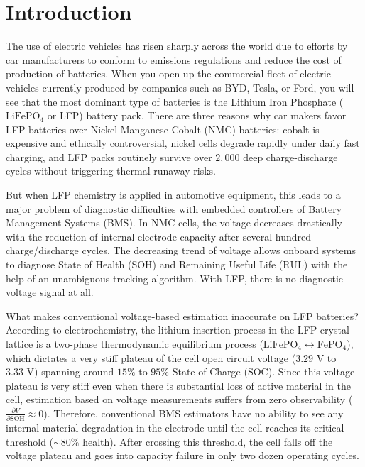 \documentclass[pdflatex,sn-mathphys-num]{sn-jnl}%
\theoremstyle{thmstyleone}%
\theoremstyle{thmstyletwo}%
\theoremstyle{thmstylethree}%
\begin{document}
\section{Introduction}\label{sec1}

The use of electric vehicles has risen sharply across the world due to efforts by car manufacturers to conform to emissions regulations and reduce the cost of production of batteries. When you open up the commercial fleet of electric vehicles currently produced by companies such as BYD, Tesla, or Ford, you will see that the most dominant type of batteries is the Lithium Iron Phosphate ($\text{LiFePO}_4$ or LFP) battery pack. There are three reasons why car makers favor LFP batteries over Nickel-Manganese-Cobalt (NMC) batteries: cobalt is expensive and ethically controversial, nickel cells degrade rapidly under daily fast charging, and LFP packs routinely survive over $2,000$ deep charge-discharge cycles without triggering thermal runaway risks.

But when LFP chemistry is applied in automotive equipment, this leads to a major problem of diagnostic difficulties with embedded controllers of Battery Management Systems (BMS). In NMC cells, the voltage decreases drastically with the reduction of internal electrode capacity after several hundred charge/discharge cycles. The decreasing trend of voltage allows onboard systems to diagnose State of Health ($\text{SOH}$) and Remaining Useful Life ($\text{RUL}$) with the help of an unambiguous tracking algorithm. With LFP, there is no diagnostic voltage signal at all.

What makes conventional voltage-based estimation inaccurate on LFP batteries? According to electrochemistry, the lithium insertion process in the LFP crystal lattice is a two-phase thermodynamic equilibrium process ($\text{LiFePO}_4 \leftrightarrow \text{FePO}_4$), which dictates a very stiff plateau of the cell open circuit voltage ($3.29\text{ V}$ to $3.33\text{ V}$) spanning around $15\%$ to $95\%$ State of Charge ($\text{SOC}$). Since this voltage plateau is very stiff even when there is substantial loss of active material in the cell, estimation based on voltage measurements suffers from zero observability ($\frac{\partial V}{\partial \text{SOH}} \approx 0$). Therefore, conventional BMS estimators have no ability to see any internal material degradation in the electrode until the cell reaches its critical threshold ($\sim 80\%$ health). After crossing this threshold, the cell falls off the voltage plateau and goes into capacity failure in only two dozen operating cycles.
\end{document}
